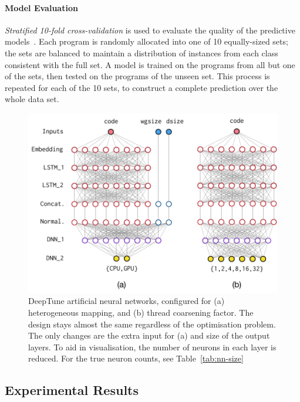 \paragraph*{Model Evaluation}

\emph{Stratified 10-fold cross-validation} is used to evaluate the quality of the predictive models~\cite{Han2011}. Each program is randomly allocated into one of 10 equally-sized sets; the sets are balanced to maintain a distribution of instances from each class consistent with the full set. A model is trained on the programs from all but one of the sets, then tested on the programs of the unseen set. This process is repeated for each of the 10 sets, to construct a complete prediction over the whole data set.

\begin{figure}[t!]
  \centering
  \includegraphics[width=\columnwidth]{img/nn} %
  \caption[DeepTune artificial neural networks]{%
    DeepTune artificial neural networks, configured for (a) heterogeneous mapping, and (b) thread coarsening factor. The design stays almost the same regardless of the optimisation problem. The only changes are the extra input for (a) and size of the output layers. To aid in visualisation, the number of neurons in each layer is reduced. For the true neuron counts, see Table~\ref{tab:nn-size}%
  }%
  \label{fig:nn}
\end{figure}


\subsection{Experimental Results}

